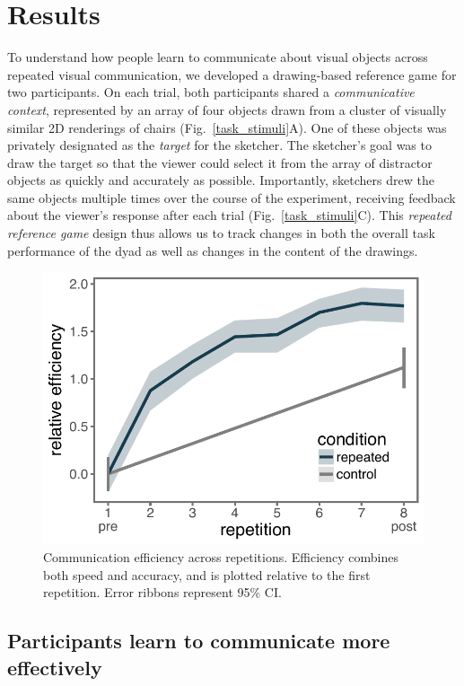 \documentclass[11pt,letterpaper]{article}
\begin{document}

\section{Results}

To understand how people learn to communicate about visual objects across repeated visual communication, we developed a drawing-based reference game for two participants.
On each trial, both participants shared a \textit{communicative context}, represented by an array of four objects drawn from a cluster of visually similar 2D renderings of chairs (Fig.~\ref{task_stimuli}A).
One of these objects was privately designated as the \emph{target} for the sketcher.
The sketcher's goal was to draw the target so that the viewer could select it from the array of distractor objects as quickly and accurately as possible.
Importantly, sketchers drew the same objects multiple times over the course of the experiment, receiving feedback about the viewer's response after each trial  (Fig.~\ref{task_stimuli}C).
This \emph{repeated reference game} design thus allows us to track changes in both the overall task performance of the dyad as well as changes in the content of the drawings.

\begin{figure}
\begin{center}
\includegraphics[width=0.5\linewidth]{figures/refgame_BIS_timeseries.pdf}
\caption{Communication efficiency across repetitions. Efficiency combines both speed and accuracy, and is plotted relative to the first repetition. Error ribbons represent 95\% CI.}
\label{refgame_bis}
\end{center}
\end{figure}

\subsection{Participants learn to communicate more effectively}
\end{document}
